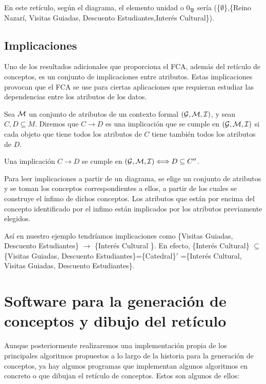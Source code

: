\documentclass[oneside,openright,titlepage,numbers=noenddot,openany,headinclude,footinclude=true,
cleardoublepage=empty,abstractoff,BCOR=5mm,paper=a4,fontsize=12pt,main=spanish]{scrreprt}
\begin{document}
En este retículo, según el diagrama, el elemento unidad o $0_{\mathfrak{B}}$ sería (\{$\emptyset$\},\{Reino Nazarí, Visitas Guiadas, Descuento Estudiantes,Interés Cultural\}).

\subsection{Implicaciones}

Uno de los resultados adicionales que proporciona el FCA, además del retículo de conceptos, es un conjunto de implicaciones entre atributos. Estas implicaciones provocan que el FCA se use para ciertas aplicaciones que requieran estudiar las dependencias entre los atributos de los datos. 

\begin{definition}
Sea $\mathcal{M}$ un conjunto de atributos de un contexto formal $(\mathcal{G},\mathcal{M},\mathcal{I})$, y sean $C,D \subseteq M$. Diremos que $C \to D$ es una implicación que se cumple en $(\mathcal{G},\mathcal{M},\mathcal{I})$ si cada objeto que tiene todos los atributos de $C$ tiene también todos los atributos de $D.$
\end{definition}

\begin{proposition}\cite{ganter_formal_1999}
Una implicación $C \to D$ se cumple en $(\mathcal{G},\mathcal{M},\mathcal{I}) \Longleftrightarrow D \subseteq C''$.
\end{proposition}

 Para leer implicaciones a partir de un diagrama, se elige un conjunto de atributos y se toman los conceptos correspondientes a ellos, a partir de los cuales se construye el ínfimo de dichos conceptos. Los  atributos  que  están  por encima  del  concepto  identificado  por  el  infimo  están implicados por los atributos previamente elegidos. 

Así en nuestro ejemplo tendríamos implicaciones como \{Visitas Guiadas, Descuento Estudiantes\} $\to$ \{Interés Cultural \}. En efecto, \{Interés Cultural\} $\subseteq $ \{Visitas Guiadas, Descuento Estudiantes\}=\{Catedral\}$'$ =\{Interés Cultural, Visitas Guiadas, Descuento Estudiantes\}.


\section{Software para la generación de conceptos y dibujo del retículo}

Aunque posteriormente realizaremos una implementación propia de los principales algoritmos propuestos a lo largo de la historia para la generación de conceptos, ya hay algunos programas que implementan algunos algoritmos en concreto o que dibujan el retículo de conceptos. Estos son algunos de ellos:
\end{document}
